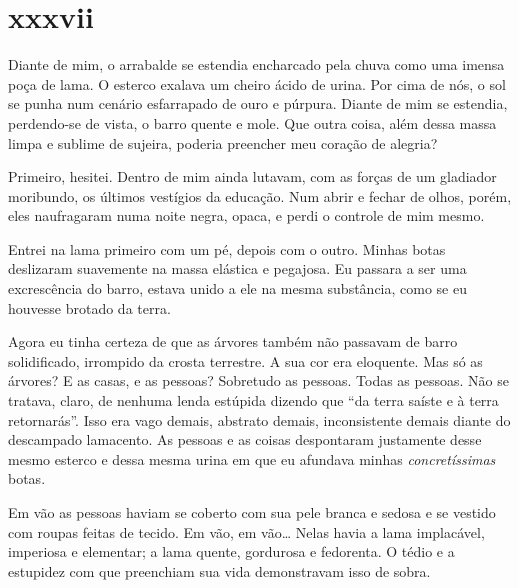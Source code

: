 \section{xxxvii} 


Diante de mim, o arrabalde se estendia encharcado pela chuva como uma imensa
poça de lama. O esterco exalava um cheiro ácido de urina. Por cima de nós, o
sol se punha num cenário esfarrapado de ouro e púrpura. Diante de mim se
estendia, perdendo-se de vista, o barro quente e mole. Que outra coisa, além
dessa massa limpa e sublime de sujeira, poderia preencher meu coração de
alegria?

Primeiro, hesitei. Dentro de mim ainda lutavam, com as forças de um gladiador
moribundo, os últimos vestígios da educação. Num abrir e fechar de olhos,
porém, eles naufragaram numa noite negra, opaca, e perdi o controle de mim
mesmo.

Entrei na lama primeiro com um pé, depois com o outro. Minhas botas deslizaram
suavemente na massa elástica e pegajosa. Eu passara a ser uma excrescência do
barro, estava unido a ele na mesma substância, como se eu houvesse brotado da
terra.

Agora eu tinha certeza de que as árvores também não passavam de barro
solidificado, irrompido da crosta terrestre. A sua cor era eloquente. Mas só
as árvores? E as casas, e as pessoas? Sobretudo as pessoas. Todas as pessoas.
Não se tratava, claro, de nenhuma lenda estúpida dizendo que ``da terra
saíste e à terra retornarás''. Isso era vago demais, abstrato demais,
inconsistente demais diante do descampado lamacento. As pessoas e as coisas
despontaram justamente desse mesmo esterco e dessa mesma urina em que eu
afundava minhas \textit{concretíssimas} botas.

Em vão as pessoas haviam se coberto com sua pele branca e sedosa e se vestido
com roupas feitas de tecido. Em vão, em vão\ldots{} Nelas havia a lama
implacável, imperiosa e elementar; a lama quente, gordurosa e fedorenta. O
tédio e a estupidez com que preenchiam sua vida demonstravam isso de sobra.


